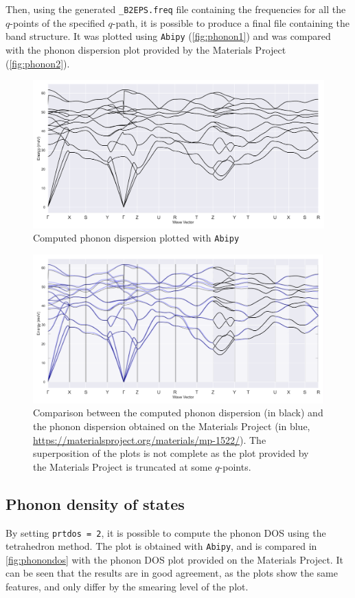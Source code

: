 \documentclass[11pt,a4paper]{article}
\begin{document}
Then, using the generated \texttt{\_B2EPS.freq} file containing the frequencies for all the $q$-points of the specified $q$-path, it is possible to produce a final file containing the band structure. It was plotted using \texttt{Abipy} (\autoref{fig:phonon1}) and was compared with the phonon dispersion plot provided by the Materials Project (\autoref{fig:phonon2}).
\begin{figure}
\centering
\includegraphics[width=\textwidth]{images/phonon1.pdf}
\caption{Computed phonon dispersion plotted with \texttt{Abipy}}
\label{fig:phonon1}
\end{figure}

\begin{figure}
\centering
\includegraphics[width=\textwidth]{images/phonon2.pdf}
\caption{Comparison between the computed phonon dispersion (in black) and the phonon dispersion obtained on the Materials Project (in blue, \url{https://materialsproject.org/materials/mp-1522/}). The superposition of the plots is not complete as the plot provided by the Materials Project is truncated at some $q$-points.}
\label{fig:phonon2}
\end{figure}

\subsection{Phonon density of states}
By setting \texttt{prtdos = 2}, it is possible to compute the phonon DOS using the tetrahedron method. The plot is obtained with \texttt{Abipy}, and is compared in \autoref{fig:phonondos} with the phonon DOS plot provided on the Materials Project. It can be seen that the results are in good agreement, as the plots show the same features, and only differ by the smearing level of the plot.
\end{document}
